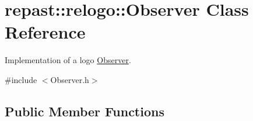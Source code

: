\hypertarget{classrepast_1_1relogo_1_1_observer}{\section{repast\-:\-:relogo\-:\-:Observer Class Reference}
\label{classrepast_1_1relogo_1_1_observer}
}


Implementation of a logo \hyperlink{classrepast_1_1relogo_1_1_observer}{Observer}.  




{\ttfamily \#include $<$Observer.\-h$>$}

\subsection*{Public Member Functions}
